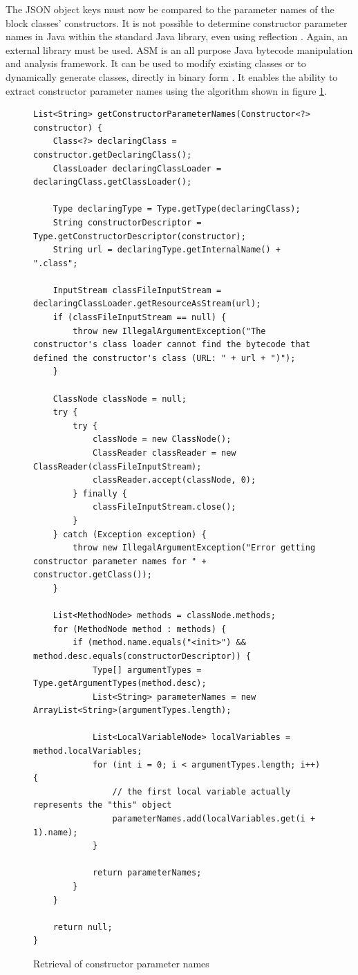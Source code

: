 The JSON object keys must now be compared to the parameter names of the block classes’ constructors. It is not possible to determine constructor parameter names in Java within the standard Java library, even using reflection \cite{java_constructor_parameter_names}. Again, an external library must be used. ASM is an all purpose Java bytecode manipulation and analysis framework. It can be used to modify existing classes or to dynamically generate classes, directly in binary form \cite{asm}. It enables the ability to extract constructor parameter names using the algorithm shown in figure  \ref{fig:constructor_parameter_names}.
\begin{figure}
\centering
\caption{Retrieval of constructor parameter names}
\label{fig:constructor_parameter_names}
\begin{verbatim}
List<String> getConstructorParameterNames(Constructor<?> constructor) {
    Class<?> declaringClass = constructor.getDeclaringClass();
    ClassLoader declaringClassLoader = declaringClass.getClassLoader();

    Type declaringType = Type.getType(declaringClass);
    String constructorDescriptor = Type.getConstructorDescriptor(constructor);
    String url = declaringType.getInternalName() + ".class";

    InputStream classFileInputStream = declaringClassLoader.getResourceAsStream(url);
    if (classFileInputStream == null) {
        throw new IllegalArgumentException("The constructor's class loader cannot find the bytecode that defined the constructor's class (URL: " + url + ")");
    }

    ClassNode classNode = null;
    try {
        try {
            classNode = new ClassNode();
            ClassReader classReader = new ClassReader(classFileInputStream);
            classReader.accept(classNode, 0);
        } finally {
            classFileInputStream.close();
        }
    } catch (Exception exception) {
        throw new IllegalArgumentException("Error getting constructor parameter names for " + constructor.getClass());
    }

    List<MethodNode> methods = classNode.methods;
    for (MethodNode method : methods) {
        if (method.name.equals("<init>") && method.desc.equals(constructorDescriptor)) {
            Type[] argumentTypes = Type.getArgumentTypes(method.desc);
            List<String> parameterNames = new ArrayList<String>(argumentTypes.length);

            List<LocalVariableNode> localVariables = method.localVariables;
            for (int i = 0; i < argumentTypes.length; i++) {
                // the first local variable actually represents the "this" object
                parameterNames.add(localVariables.get(i + 1).name);
            }

            return parameterNames;
        }
    }

    return null;
}
\end{verbatim}
\end{figure}
